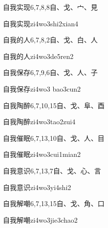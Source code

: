 \begin{entry}{自我实现}{6,7,8,8}{⾃、⼽、⼧、⾒}
  \begin{phonetics}{自我实现}{zi4wo3shi2xian4}
  \end{phonetics}
\end{entry}

\begin{entry}{自我的人}{6,7,8,2}{⾃、⼽、⽩、⼈}
  \begin{phonetics}{自我的人}{zi4wo3de5ren2}
  \end{phonetics}
\end{entry}

\begin{entry}{自我保存}{6,7,9,6}{⾃、⼽、⼈、⼦}
  \begin{phonetics}{自我保存}{zi4wo3 bao3cun2}
  \end{phonetics}
\end{entry}

\begin{entry}{自我陶醉}{6,7,10,15}{⾃、⼽、⾩、⾣}
  \begin{phonetics}{自我陶醉}{zi4wo3tao2zui4}
  \end{phonetics}
\end{entry}

\begin{entry}{自我催眠}{6,7,13,10}{⾃、⼽、⼈、⽬}
  \begin{phonetics}{自我催眠}{zi4wo3cui1mian2}
  \end{phonetics}
\end{entry}

\begin{entry}{自我意识}{6,7,13,7}{⾃、⼽、⼼、⾔}
  \begin{phonetics}{自我意识}{zi4wo3yi4shi2}
  \end{phonetics}
\end{entry}

\begin{entry}{自我解嘲}{6,7,13,15}{⾃、⼽、⾓、⼝}
  \begin{phonetics}{自我解嘲}{zi4wo3jie3chao2}
  \end{phonetics}
\end{entry}

